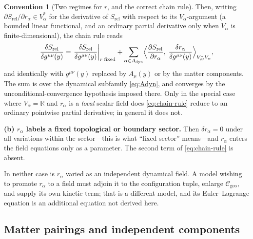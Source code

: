 \documentclass[11pt,a4paper]{article}
\theoremstyle{plain}
\theoremstyle{definition}
\newtheorem{convention}[theorem]{Convention}
\theoremstyle{remark}
\newcommand{\Real}{\mathbb{R}}
\newcommand{\Cgeo}{\mathcal{C}_{\mathrm{geo}}}
\begin{document}
\begin{convention}[Two regimes for $r$, and the correct chain rule]
Then, writing $\partial S_{\mathrm{rel}}/\partial r_\alpha\in V_\alpha^{*}$ for the derivative of
$S_{\mathrm{rel}}$ with respect to its $V_\alpha$-argument (a bounded linear functional, and an
ordinary partial derivative only when $V_\alpha$ is finite-dimensional), the chain rule reads
\begin{equation}
\label{eq:chain-rule}
\frac{\delta S_{\mathrm{rel}}}{\delta g^{\mu\nu}(y)}
=\left.\frac{\delta S_{\mathrm{rel}}}{\delta g^{\mu\nu}(y)}\right|_{r\;\mathrm{fixed}}
+\sum_{\alpha\in A_{\mathrm{dyn}}}
\Bigl\langle \frac{\partial S_{\mathrm{rel}}}{\partial r_\alpha},\;
\frac{\delta r_\alpha}{\delta g^{\mu\nu}(y)}\Bigr\rangle_{V_\alpha^*\!,V_\alpha} ,
\end{equation}
and identically with $g^{\mu\nu}(y)$ replaced by $A_\mu(y)$ or by the matter components. The sum is
over the dynamical subfamily \eqref{eq:Adyn}, and converges by the unconditional-convergence
hypothesis imposed there. Only in the special case where $V_\alpha=\Real$ and $r_\alpha$ is a
\emph{local} scalar field does \eqref{eq:chain-rule} reduce to an ordinary pointwise partial
derivative; in general it does not.

\medskip
\noindent\textbf{(b) $r_\alpha$ labels a fixed topological or boundary sector.}
Then $\delta r_\alpha=0$ under all variations within the sector---this is what ``fixed sector''
means---and $r_\alpha$ enters the field equations only as a parameter. The second term of
\eqref{eq:chain-rule} is absent.

\medskip
In neither case is $r_\alpha$ varied as an independent dynamical field. A model wishing to promote
$r_\alpha$ to a field must adjoin it to the configuration tuple, enlarge $\Cgeo$, and supply its own
kinetic term; that is a different model, and its Euler--Lagrange equation is an additional equation
not derived here.
\end{convention}

\subsection{Matter pairings and independent components}
\label{sec:matter-pairing}
\end{document}
